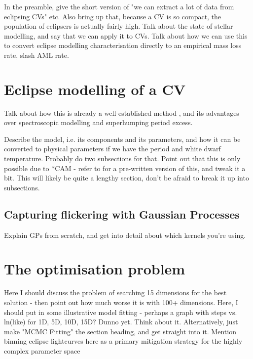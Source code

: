 \label{chpt:modelling and techniques} %


In the preamble, give the short version of "we can extract a lot of data from eclipsing CVs" etc.
Also bring up that, because a CV is so compact, the population of eclipsers is actually fairly high.
Talk about the state of stellar modelling, and say that we can apply it to CVs. Talk about how we can use this to convert eclipse modelling characterisation directly to an empirical mass loss rate, slash AML rate.


\section{Eclipse modelling of a CV}
Talk about how this is already a well-established method \citep{wood1986, Savoury2011, McAllister2017, McAllister2019}, and its advantages over spectroscopic modelling and superhumping period excess.

Describe the model, i.e. its components and its parameters, and how it can be converted to physical parameters if we have the period and white dwarf temperature. Probably do two subsections for that. Point out that this is only possible due to *CAM - refer to \citet{wild2021} for a pre-written version of this, and tweak it a bit. This will likely be quite a lengthy section, don't be afraid to break it up into subsections.

\subsection{Capturing flickering with Gaussian Processes}
Explain GPs from scratch, and get into detail about which kernels you're using. 

\section{The optimisation problem}
Here I should discuss the problem of searching 15 dimensions for the best solution - then point out how much worse it is with 100+ dimensions. Here, I should put in some illustrative model fitting - perhaps a graph with steps vs. ln(like) for 1D, 5D, 10D, 15D? Dunno yet. Think about it. Alternatively, just make "MCMC Fitting" the section heading, and get straight into it. Mention binning eclipse lightcurves here as a primary mitigation strategy for the highly complex parameter space

